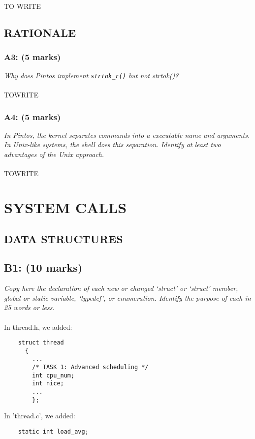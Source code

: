 \documentclass[a4paper,12pt]{article}
\begin{document}
\\ \\TO WRITE

\subsection{RATIONALE}

\subsubsection*{A3: (5 marks) }
\textit{Why does Pintos implement \texttt{strtok\_r()} but not strtok()?}
\\ \\TOWRITE


\subsubsection*{A4: (5 marks) }
\textit{In Pintos, the kernel separates commands into a executable name and
arguments. In Unix-like systems, the shell does this separation. Identify at
least two advantages of the Unix approach.}
\\ \\TOWRITE

\section{SYSTEM CALLS}

\subsection{DATA STRUCTURES}

\subsection*{B1: (10 marks) }

\textit{Copy here the declaration of each new or changed ‘struct’ or ‘struct’
member, global or static variable, ‘typedef’, or enumeration. Identify the
purpose of each in 25 words or less.}
\\\\
In thread.h, we added:
\begin{lstlisting}
    struct thread
      {
        ...
        /* TASK 1: Advanced scheduling */
        int cpu_num;
        int nice;
        ...
        };
\end{lstlisting}

In 'thread.c', we added:
\begin{lstlisting}
    static int load_avg;
\end{lstlisting}
\end{document}
